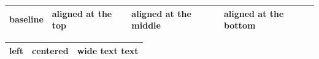 \documentclass[a4paper]{article}
\begin{document}
\begin{tabular*}{10cm}{@{}lp{1.2cm}m{1.2cm}b{1.2cm}@{}}
    \hline
    baseline & aligned at the top & aligned at the middle
    & aligned at the bottom\\
	\hline
\end{tabular*}

\begin{tabularx}{0.9\textwidth}{l|c|>{\centering\arraybackslash}X}
    \toprule[3pt]
    left & centered & wide text text\\
    \bottomrule[3pt]
\end{tabularx}
\end{document}
